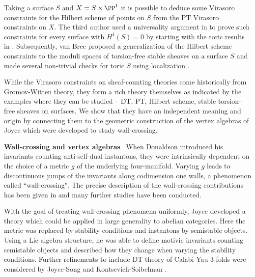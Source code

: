 Taking a surface $S$ and $X=S\times \PP^1$ it is possible to deduce some Virasoro constraints for the Hilbert scheme of points on $S$ from the PT Virasoro constraints on $X$. The third author used a universality argument in \cite{moreira} to prove such constraints for every surface with $H^1(S)=0$ by starting with the toric results in \cite{moop}. Subsequently, van Bree proposed a generalization of the Hilbert scheme constraints to the moduli spaces of torsion-free stable sheaves on a surface $S$ and made several non-trivial checks for toric $S$ using localization \cite{bree}.


While the Virasoro constraints on sheaf-counting theories come historically from Gromov-Witten theory, they form a rich theory themselves as indicated by the examples where they can be studied -- DT, PT, Hilbert scheme, stable torsion-free sheaves on surfaces. We show that they have an independent meaning and origin by connecting them to the geometric construction of the vertex algebras of Joyce \cite{Jo17} which were developed to study wall-crossing.



\textbf{Wall-crossing and vertex algebras} \
When Donaldson \cite{Do83} introduced his invariants counting anti-self-dual instantons, they were intrinsically dependent on the choice of a metric $g$ of the underlying four-manifold. Varying $g$ leads to discontinuous jumps of the invariants along codimension one walls, a phenomenon called ``wall-crossing". The precise description of the wall-crossing contributions has been given in \cite{KoMo94} and many further studies have been conducted.



With the goal of treating wall-crossing phenomena uniformly, Joyce \cite{JO06I,JO06II,JO06III,JO06IV} developed a theory which could be applied in large generality to abelian categories. Here the metric was replaced by stability conditions and instantons by semistable objects. Using a Lie algebra structure, he was able to define motivic invariants counting semistable objects and described how they change when varying the stability conditions. Further refinements to include DT theory of Calabi-Yau 3-folds were considered by Joyce-Song \cite{JS12} and Kontsevich-Soibelman \cite{KS08}.


